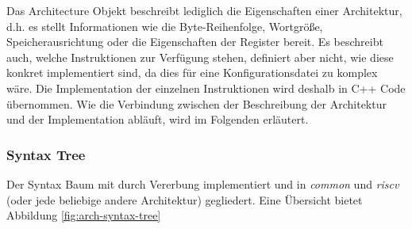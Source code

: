 Das Architecture Objekt beschreibt lediglich die Eigenschaften einer Architektur,
d.h. es stellt Informationen wie die Byte-Reihenfolge, Wortgröße, Speicherausrichtung
oder die Eigenschaften der Register bereit. Es beschreibt auch, welche Instruktionen
zur Verfügung stehen, definiert aber nicht, wie diese konkret implementiert sind,
da dies für eine Konfigurationsdatei zu komplex wäre. Die Implementation der
einzelnen Instruktionen wird deshalb in C++ Code übernommen. Wie die Verbindung
zwischen der Beschreibung der Architektur und der Implementation abläuft, wird
im Folgenden erläutert.

\subsubsection{Syntax Tree}

Der Syntax Baum mit durch Vererbung implementiert und in \textit{common} und
\textit{riscv} (oder jede beliebige andere Architektur) gegliedert. Eine Übersicht
bietet Abbildung \ref{fig:arch-syntax-tree}

